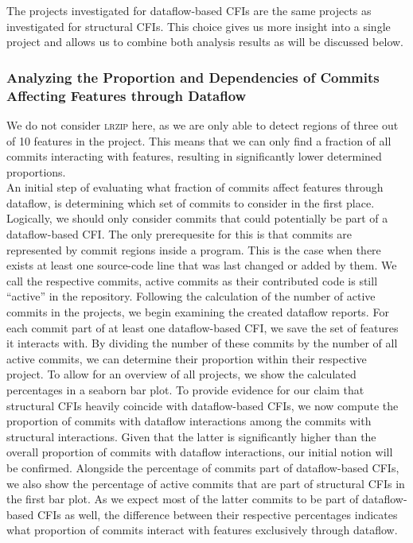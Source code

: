 The projects investigated for dataflow-based CFIs are the same projects as investigated for structural CFIs.
This choice gives us more insight into a single project and allows us to combine both analysis results as will be discussed below.

\subsubsection*{Analyzing the Proportion and Dependencies of Commits Affecting Features through Dataflow}

We do not consider \textsc{lrzip} here, as we are only able to detect regions of three out of 10 features in the project.
This means that we can only find a fraction of all commits interacting with features, resulting in significantly lower determined proportions. \\
An initial step of evaluating what fraction of commits affect features through dataflow, is determining which set of commits to consider in the first place.
Logically, we should only consider commits that could potentially be part of a dataflow-based CFI.
The only prerequesite for this is that commits are represented by commit regions inside a program.
This is the case when there exists at least one source-code line that was last changed or added by them.
We call the respective commits, \textsf{active} commits as their contributed code is still ``active'' in the repository.
Following the calculation of the number of active commits in the projects, we begin examining the created dataflow reports.
For each commit part of at least one dataflow-based CFI, we save the set of features it interacts with.
By dividing the number of these commits by the number of all active commits, we can determine their proportion within their respective project.
To allow for an overview of all projects, we show the calculated percentages in a \textsf{seaborn} bar plot.
To provide evidence for our claim that structural CFIs heavily coincide with dataflow-based CFIs, we now compute the proportion of commits with dataflow interactions among the commits with structural interactions.
Given that the latter is significantly higher than the overall proportion of commits with dataflow interactions, our initial notion will be confirmed.
Alongside the percentage of commits part of dataflow-based CFIs, we also show the percentage of active commits that are part of structural CFIs in the first bar plot.
As we expect most of the latter commits to be part of dataflow-based CFIs as well, the difference between their respective percentages indicates what proportion of commits interact with features exclusively through dataflow.
